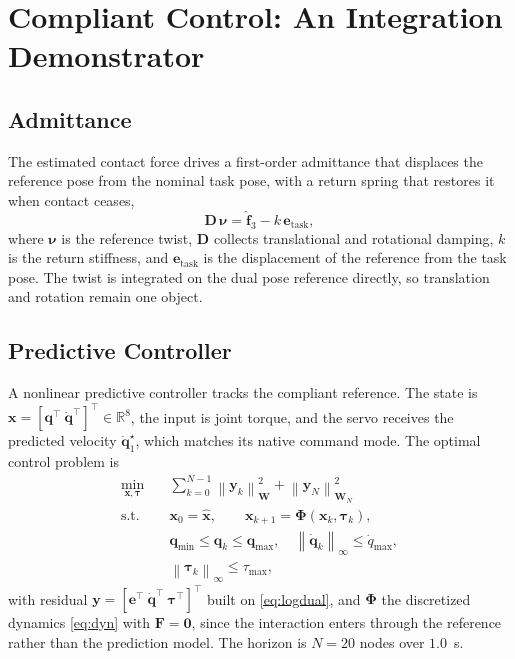 \documentclass{ieeeaccess}
\newcommand{\R}{\mathbb{R}}
\newcommand{\norm}[1]{\left\| #1 \right\|}
\begin{document}
\section{Compliant Control: An Integration Demonstrator}
\label{sec:control}

\subsection{Admittance}
The estimated contact force drives a first-order admittance that displaces the
reference pose from the nominal task pose, with a return spring that restores it
when contact ceases,
\begin{equation}
\bm D\,\bm\nu = \hat{\bm f}_{3} - k\,\bm e_{\mathrm{task}},
\label{eq:admittance}
\end{equation}
where $\bm\nu$ is the reference twist, $\bm D$ collects translational and
rotational damping, $k$ is the return stiffness, and $\bm e_{\mathrm{task}}$ is the
displacement of the reference from the task pose. The twist is integrated on the
dual pose reference directly, so translation and rotation remain one object.

\subsection{Predictive Controller}
A nonlinear predictive controller tracks the compliant reference. The state is
$\bm x=[\bm q^{\!\top}\ \dot{\bm q}^{\!\top}]^{\!\top}\in\R^8$, the input is joint
torque, and the servo receives the predicted velocity $\dot{\bm q}^\star_1$, which
matches its native command mode. The optimal control problem is
\begin{equation}
\begin{aligned}
\min_{\bm x,\bm\tau}\quad
&\sum_{k=0}^{N-1}\norm{\bm y_k}^2_{\bm W}+\norm{\bm y_N}^2_{\bm W_N}\\
\mathrm{s.t.}\quad
&\bm x_0=\hat{\bm x},\qquad \bm x_{k+1}=\bm\Phi(\bm x_k,\bm\tau_k),\\
&\bm q_{\min}\le\bm q_k\le\bm q_{\max},\quad
\norm{\dot{\bm q}_k}_\infty\le\dot q_{\max},\\
&\norm{\bm\tau_k}_\infty\le\tau_{\max},
\end{aligned}
\label{eq:ocp}
\end{equation}
with residual $\bm y=[\bm e^{\!\top}\ \dot{\bm q}^{\!\top}\ \bm\tau^{\!\top}]^{\!\top}$
built on \eqref{eq:logdual}, and $\bm\Phi$ the discretized dynamics \eqref{eq:dyn}
with $\bm F=\bm 0$, since the interaction enters through the reference rather than
the prediction model. The horizon is $N=20$ nodes over $1.0$~s.
\end{document}
